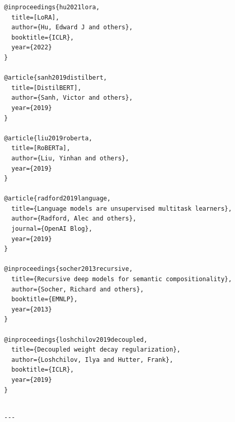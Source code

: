 \begin{lstlisting}
@inproceedings{hu2021lora,
  title=[LoRA],
  author={Hu, Edward J and others},
  booktitle={ICLR},
  year={2022}
}

@article{sanh2019distilbert,
  title=[DistilBERT],
  author={Sanh, Victor and others},
  year={2019}
}

@article{liu2019roberta,
  title=[RoBERTa],
  author={Liu, Yinhan and others},
  year={2019}
}

@article{radford2019language,
  title={Language models are unsupervised multitask learners},
  author={Radford, Alec and others},
  journal={OpenAI Blog},
  year={2019}
}

@inproceedings{socher2013recursive,
  title={Recursive deep models for semantic compositionality},
  author={Socher, Richard and others},
  booktitle={EMNLP},
  year={2013}
}

@inproceedings{loshchilov2019decoupled,
  title={Decoupled weight decay regularization},
  author={Loshchilov, Ilya and Hutter, Frank},
  booktitle={ICLR},
  year={2019}
}
\end{lstlisting}
\begin{lstlisting}

---
\end{lstlisting}